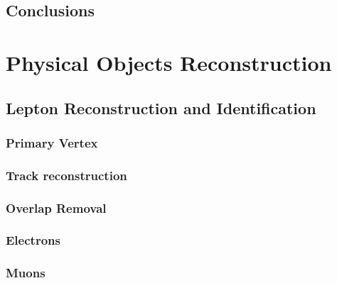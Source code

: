 \documentclass[10pt,twoside,cucitura,classica,english,openany]{toptesi}
\begin{document}


\section{Conclusions}
\label{sec:conclusions}



\chapter{Physical Objects Reconstruction}
\label{cha:phys-objects-reconst}

\section{Lepton Reconstruction and Identification}
\label{sec:lept-reconstr-ident}



\subsection{Primary Vertex}
\label{sec:primary-vertex}



\subsection{Track reconstruction}
\label{sec:track-reconstruction}



\subsection{Overlap Removal}
\label{sec:overlap-removal}



\subsection{Electrons}
\label{sec:electrons}



\subsection{Muons}
\label{sec:muons}


\end{document}
